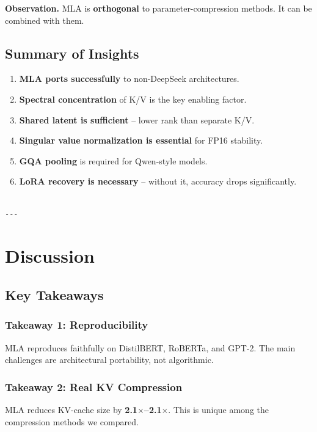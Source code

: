 \textbf{Observation.} MLA is \textbf{orthogonal} to parameter-compression methods. It 
can be combined with them.

\subsection{Summary of Insights}

\begin{enumerate}
\item \textbf{MLA ports successfully} to non-DeepSeek architectures.
\item \textbf{Spectral concentration} of K/V is the key enabling factor.
\item \textbf{Shared latent is sufficient} -- lower rank than separate K/V.
\item \textbf{Singular value normalization is essential} for FP16 stability.
\item \textbf{GQA pooling} is required for Qwen-style models.
\item \textbf{LoRA recovery is necessary} -- without it, accuracy drops
  significantly.
\end{enumerate}
\begin{lstlisting}

---
\end{lstlisting}


\section{Discussion}

\subsection{Key Takeaways}

\subsubsection{Takeaway 1: Reproducibility}

MLA reproduces faithfully on DistilBERT, RoBERTa, and GPT-2. The main 
challenges are architectural portability, not algorithmic.

\subsubsection{Takeaway 2: Real KV Compression}

MLA reduces KV-cache size by \textbf{2.1$\times$--2.1$\times$}. This is 
unique among the compression methods we compared.

